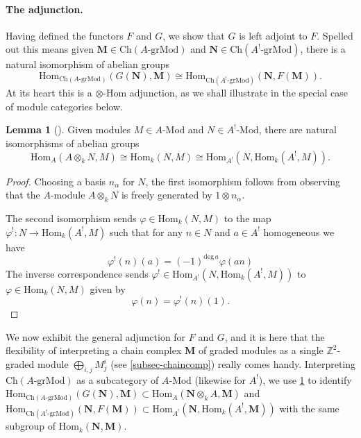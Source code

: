\documentclass[a4paper]{article}
\theoremstyle{definition}
\newtheorem{lemma}[defn]{Lemma}
\theoremstyle{remark}
\newcommand{\grMod}{\ensuremath{\text{-grMod}}}
\newcommand{\Mod}{\ensuremath{\text{-Mod}}}
\newcommand{\Ch}{\ensuremath{\text{Ch}}}
\newcommand{\Hom}{\ensuremath{\text{Hom}}}
\begin{document}
\paragraph{The adjunction.} 
Having defined the functors \(F\) and \(G\), we show that \(G\) is left adjoint
to \(F\). Spelled out this means given \(\mathbf{M}\in \Ch(A\grMod)\) and
\(\mathbf{N}\in \Ch(A^!\grMod)\), there is a natural isomorphism of abelian
groups
\[\Hom_{\Ch(A\grMod)}(G(\mathbf{N}), \mathbf{M}) \cong
\Hom_{\Ch(A^!\grMod)}(\mathbf{N}, F(\mathbf{M})).\]
At its heart this is a \(\otimes\)-\(\Hom\) adjunction, as we shall illustrate in
the special case of module categories below. 

\begin{lemma}[] \label{adjunction-simple}
    Given modules \(M\in A\Mod\) and \(N\in A^!\Mod\), there are natural
    isomorphisms of abelian groups
    \[\Hom_{A}(A\otimes_k N, M) \cong \Hom_k(N,M) \cong \Hom_{A^!}(N,
    \Hom_{k}(A^!,M)).\]
    \begin{proof}
        Choosing a basis \(n_\alpha\) for \(N\), the first isomorphism follows
        from observing that the \(A\)-module \(A\otimes_k N\) is freely
        generated by \(1\otimes n_\alpha\). 

        The second isomorphism sends \(\varphi\in \Hom_k(N,M)\) to the map
        \(\varphi^!: N\rightarrow \Hom_k(A^!, M)\) such that for any \(n\in N\)
        and \(a\in A^!\) homogeneous we have 
        \[\varphi^!(n)(a) = (-1)^{\text{deg}\,a}\varphi(an)\] 
        The inverse correspondence sends \(\varphi^!\in \Hom_{A^!}(N,
        \Hom_k(A^!,M))\) to \(\varphi\in \Hom_k(N,M)\) given by 
        \[\varphi(n)= \varphi^!(n)(1).\]
    \end{proof}
\end{lemma}

We now exhibit the general adjunction for \(F\) and \(G\), and it is here that
the flexibility of interpreting a chain complex \(\mathbf{M}\) of graded modules
as a single \(\mathbb{Z}^2\)-graded module \(\bigoplus_{i,j}M^i_j\) (see
\cref{subsec-chaincomp}) really comes handy.  Interpreting \(\Ch(A\grMod)\) as a
subcategory of \(A\Mod\) (likewise for \(A^!\)), we use \cref{adjunction-simple}
to identify \(\Hom_{\Ch(A\grMod)}(G(\mathbf{N}),\mathbf{M})\subset
\Hom_A(\mathbf{N}\otimes_k A, \mathbf{M})\) and
\(\Hom_{\Ch(A^!\grMod)}(\mathbf{N},F(\mathbf{M}))\subset \Hom_{A^!}(\mathbf{N},
\Hom_k(A^!,\mathbf{M}))\) with the same subgroup of
\(\Hom_k(\mathbf{N},\mathbf{M})\).
\end{document}
